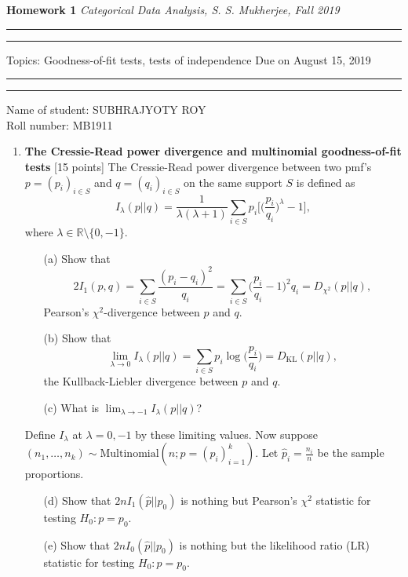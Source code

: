 \documentclass[12pt]{article}
\def\R{\mathbb{R}}
\begin{document}
\begin{center}{\large\textbf{Homework 1} \hfill \large \textit{Categorical Data Analysis, S. S. Mukherjee, Fall 2019}} 
\end{center}
\hrule\hrule\vskip3pt
Topics: Goodness-of-fit tests, tests of independence \hfill Due on August 15, 2019\vskip3pt
\hrule\hrule\vskip3pt\noindent
Name of student: SUBHRAJYOTY ROY\\
Roll number: MB1911
\begin{enumerate}
\item
\begin{problem}
\textbf{The Cressie-Read power divergence and multinomial goodness-of-fit tests} \hfill [15 points]\vskip3pt
The Cressie-Read power divergence between two pmf's $p = (p_i)_{i \in S}$ and $q = (q_i)_{i \in S}$ on the same support $S$ is defined as
\[
	I_{\lambda}(p || q) = \frac{1}{\lambda(\lambda + 1)} \sum_{i \in S}p_i \bigg[\bigg(\frac{p_i}{q_i} \bigg)^\lambda - 1\bigg],
\]
where $\lambda \in \R\setminus\{0, - 1\}.$ 
\begin{enumerate}
\item[(a)] Show that 
\[
	2 I_1 (p, q) = \sum_{i \in S} \frac{(p_i - q_i)^2}{q_i} = \sum_{i \in S} \bigg(\frac{p_i}{q_i} - 1\bigg)^2 q_i = D_{\chi^2}(p || q),
\]
Pearson's $\chi^2$-divergence between $p$ and $q$.

\item[(b)] Show that
\[
	\lim_{\lambda \rightarrow 0} I_{\lambda}(p || q) = \sum_{i \in S} p_i \log \big(\frac{p_i}{q_i}\big) = D_{\mathrm{KL}}(p||q),
\]
the Kullback-Liebler divergence between $p$ and $q$.

\item[(c)] What is $\lim_{\lambda \rightarrow -1} I_{\lambda}(p || q)$?
\end{enumerate}

Define $I_{\lambda}$ at $\lambda = 0, -1$ by these limiting values. Now suppose $(n_1, \ldots, n_k) \sim \mathrm{Multinomial}(n; p = (p_i)_{i = 1}^k)$. Let $\hat{p}_i = \frac{n_i}{n}$ be the sample proportions.

\begin{enumerate}

\item[(d)] Show that $2nI_1(\hat{p} || p_0)$ is nothing but Pearson's $\chi^2$ statistic for testing $H_0: p = p_0$.

\item[(e)] Show that $2nI_0(\hat{p} || p_0)$ is nothing but the likelihood ratio (LR) statistic for testing $H_0: p = p_0$.


\end{enumerate}
\end{problem}
\end{enumerate}
\end{document}

